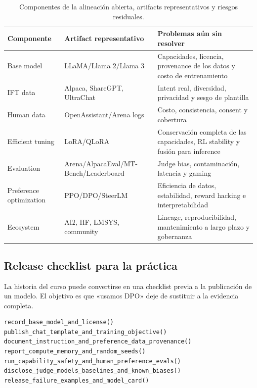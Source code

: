 \begin{table}[H]
\centering
\small
\begin{tabularx}{\textwidth}{L{0.16\textwidth} L{0.22\textwidth} X}
\toprule
Componente & Artifact representativo & Problemas aún sin resolver \\
\midrule
Base model & LLaMA/Llama 2/Llama 3 & Capacidades, licencia, provenance de los datos y costo de entrenamiento \\
IFT data & Alpaca, ShareGPT, UltraChat & Intent real, diversidad, privacidad y sesgo de plantilla \\
Human data & OpenAssistant/Arena logs & Costo, consistencia, consent y cobertura \\
Efficient tuning & LoRA/QLoRA & Conservación completa de las capacidades, RL stability y fusión para inference \\
Evaluation & Arena/AlpacaEval/MT-Bench/Leaderboard & Judge bias, contaminación, latencia y gaming \\
Preference optimization & PPO/DPO/SteerLM & Eficiencia de datos, estabilidad, reward hacking e interpretabilidad \\
Ecosystem & AI2, HF, LMSYS, community & Lineage, reproducibilidad, mantenimiento a largo plazo y gobernanza \\
\bottomrule
\end{tabularx}
\caption{Componentes de la alineación abierta, artifacts representativos y riesgos residuales.}
\end{table}

\subsection{Release checklist para la práctica}

La historia del curso puede convertirse en una checklist previa a la publicación de un modelo. El objetivo es que «usamos DPO» deje de sustituir a la evidencia completa.

\begin{lstlisting}[caption={Open aligned model release checklist}]
record_base_model_and_license()
publish_chat_template_and_training_objective()
document_instruction_and_preference_data_provenance()
report_compute_memory_and_random_seeds()
run_capability_safety_and_human_preference_evals()
disclose_judge_models_baselines_and_known_biases()
release_failure_examples_and_model_card()
\end{lstlisting}

